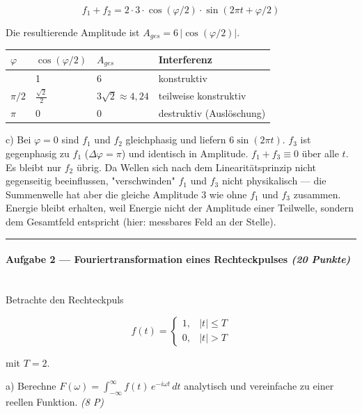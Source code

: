 \documentclass[11pt, a4paper]{article}
\begin{document}
\[
f_1+f_2 = 2\cdot 3\cdot \cos(\varphi/2)\cdot \sin(2\pi t + \varphi/2)
\]

Die resultierende Amplitude ist $A_{ges} = 6\,|\cos(\varphi/2)|$.



{\small
\begin{tabularx}{\linewidth}{XXXX}
\hline
\rowcolor{tableheadbg}
{\color{white}\textbf{$\varphi$}} & {\color{white}\textbf{$\cos(\varphi/2)$}} & {\color{white}\textbf{$A_{ges}$}} & {\color{white}\textbf{Interferenz}} \\[2pt]
\hline
\endhead
\hline
\endfoot
0 & 1 & 6 & konstruktiv \\
$\pi/2$ & $\frac{\sqrt{2}}{2}$ & $3\sqrt{2}\approx 4{,}24$ & teilweise konstruktiv \\
$\pi$ & 0 & 0 & destruktiv (Auslöschung) \\
\end{tabularx}
}


c) Bei $\varphi = 0$ sind $f_1$ und $f_2$ gleichphasig und liefern $6\sin(2\pi t)$. $f_3$ ist gegenphasig zu $f_1$ ($\Delta\varphi = \pi$) und identisch in Amplitude. $f_1 + f_3 \equiv 0$ über alle $t$. Es bleibt nur $f_2$ übrig. Da Wellen sich nach dem Linearitätsprinzip nicht gegenseitig beeinflussen, "verschwinden" $f_1$ und $f_3$ nicht physikalisch — die Summenwelle hat aber die gleiche Amplitude 3 wie ohne $f_1$ und $f_3$ zusammen. Energie bleibt erhalten, weil Energie nicht der Amplitude einer Teilwelle, sondern dem Gesamtfeld entspricht (hier: messbares Feld an der Stelle).



\noindent\textcolor{rulegray}{\rule{\linewidth}{0.4pt}}


\paragraph{Aufgabe 2 — Fouriertransformation eines Rechteckpulses \textit{(20 Punkte)}}\mbox{}\\[2pt]

Betrachte den Rechteckpuls

\[
f(t) = \begin{cases} 1, & |t| \leq T \\ 0, & |t| > T \end{cases}
\]

mit $T = 2$.


a) Berechne $F(\omega) = \int_{-\infty}^{\infty} f(t)\,e^{-i\omega t}\,dt$ analytisch und vereinfache zu einer reellen Funktion. \textit{(8 P)}
\end{document}
